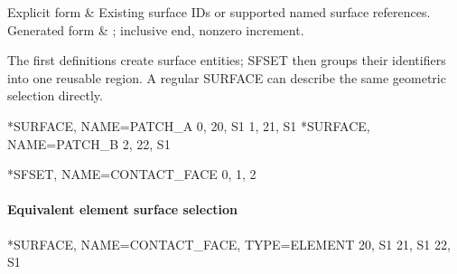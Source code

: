 \begin{keyworddata}
Explicit form & Existing surface IDs or supported named surface references. \\
Generated form & ; inclusive end, nonzero increment. \\
\end{keyworddata}

The first definitions create surface entities; SFSET then groups their identifiers into one reusable region. A regular SURFACE can describe the same geometric selection directly.

\exampleheading

\begin{inputdeck}
*SURFACE, NAME=PATCH_A
0, 20, S1
1, 21, S1
*SURFACE, NAME=PATCH_B
2, 22, S1

*SFSET, NAME=CONTACT_FACE
0, 1, 2
\end{inputdeck}

\paragraph*{Equivalent element surface selection}
\begin{inputdeck}
*SURFACE, NAME=CONTACT_FACE, TYPE=ELEMENT
20, S1
21, S1
22, S1
\end{inputdeck}
